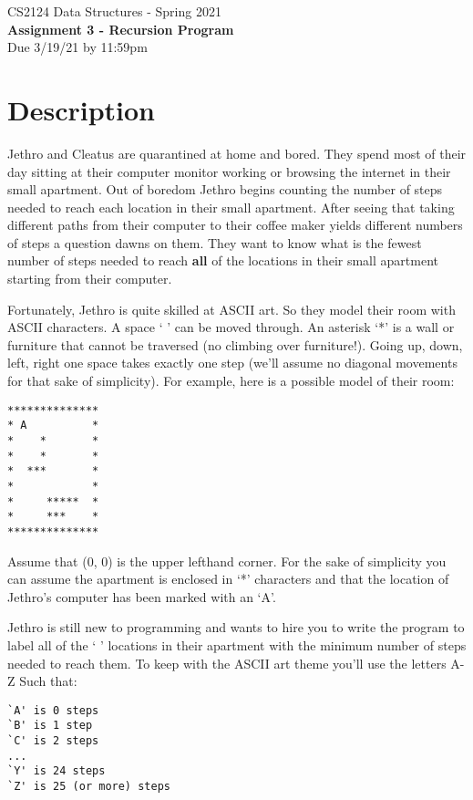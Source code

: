 \documentclass[12pt]{elsart}
\begin{document}
\pagestyle{empty}

\begin{center}
\Large  CS2124 Data Structures - Spring 2021 \\
\large {\bf Assignment 3 - Recursion Program}\\
\normalsize Due 3/19/21 by 11:59pm
\end{center}

\section{Description} 

Jethro and Cleatus are quarantined at home and bored. They spend most of their day sitting at their computer monitor working or browsing the internet in their small apartment. Out of boredom Jethro begins counting the number of steps needed to reach each location in their small apartment. After seeing that taking different paths from their computer to their coffee maker yields different numbers of steps a question dawns on them. They want to know what is the fewest number of steps needed to reach {\bf all} of the locations in their small apartment starting from their computer.  

Fortunately, Jethro is quite skilled at ASCII art. So they model their room with ASCII characters. A space ` ' can be moved through. An asterisk `*' is a wall or furniture that cannot be traversed (no climbing over furniture!).  Going up, down, left, right one space takes exactly one step (we'll assume no diagonal movements for that sake of simplicity). For example, here is a possible model of their room:

{\small
\begin{verbatim}
**************
* A          *
*    *       *
*    *       *
*  ***       *
*            *
*     *****  *
*     ***    *
**************
\end{verbatim}
}

Assume that (0, 0) is the upper lefthand corner.  For the sake of simplicity you can assume the apartment is enclosed in `*' characters and that the location of Jethro's computer has been marked with an `A'.

Jethro is still new to programming and wants to hire you to write the program to label all of the ` ' locations in their apartment with the minimum number of steps needed to reach them.  To keep with the ASCII art theme you'll use the letters A-Z Such that:

{\small
\begin{verbatim}
`A' is 0 steps 
`B' is 1 step 
`C' is 2 steps
...
`Y' is 24 steps
`Z' is 25 (or more) steps
\end{verbatim}
}
\end{document}
